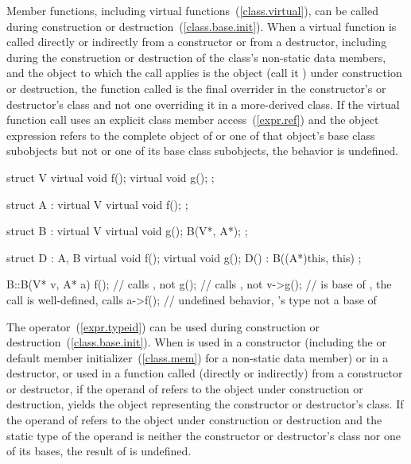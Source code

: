 \pnum
{}%
%
%
%
Member functions, including virtual functions~(\ref{class.virtual}), can be called
during construction or destruction~(\ref{class.base.init}).
When a virtual function is called directly or indirectly from a constructor
or from a destructor,
including during the construction or destruction of the class's non-static data
members,
and the object to which the call applies is the object (call it ) under construction or
destruction,
the function called is the
final overrider in the constructor's or destructor's class and not one
overriding it in a more-derived class.
If the virtual function call uses an explicit class member access~(\ref{expr.ref})
and the object expression refers to
the complete object of  or one of that object's base class subobjects
but not  or one of its base class subobjects, the behavior
is undefined.
\begin{example}

\begin{codeblock}
struct V {
  virtual void f();
  virtual void g();
};

struct A : virtual V {
  virtual void f();
};

struct B : virtual V {
  virtual void g();
  B(V*, A*);
};

struct D : A, B {
  virtual void f();
  virtual void g();
  D() : B((A*)this, this) { }
};

B::B(V* v, A* a) {
  f();              // calls , not 
  g();              // calls , not 
  v->g();           //  is base of , the call is well-defined, calls 
  a->f();           // undefined behavior, 's type not a base of 
}
\end{codeblock}
\end{example}

\pnum
{}%
%
%
%
The
operator~(\ref{expr.typeid}) can be used during construction or destruction~(\ref{class.base.init}).
When
is used in a constructor (including the
 or default member initializer~(\ref{class.mem})
for a non-static data member)
or in a destructor, or used in a function called (directly or indirectly) from
a constructor or destructor, if the operand of
refers to the object under construction or destruction,
yields the
object representing the constructor or destructor's class.
If the operand of
refers to the object under construction or destruction and the static type of
the operand is neither the constructor or destructor's class nor one of its
bases, the result of
is undefined.

